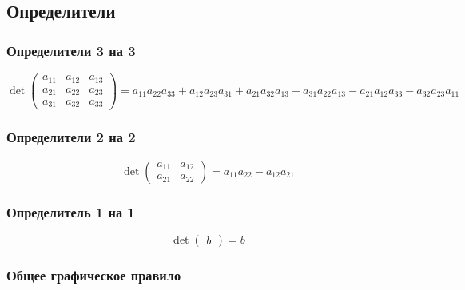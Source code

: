 \documentclass[class=article,a4paper,12pt,crop=false]{standalone}
\begin{document}
  \subsection{Определители}
  
  \subsubsection{Определители 3 на 3}

    \begin{equation}
      \det{
        \begin{pmatrix}
          a_{11} & a_{12} & a_{13} \\
          a_{21} & a_{22} & a_{23} \\
          a_{31} & a_{32} & a_{33}
        \end{pmatrix}
      }
      = a_{11}a_{22}a_{33}
      + a_{12}a_{23}a_{31}
      + a_{21}a_{32}a_{13}
      - a_{31}a_{22}a_{13}
      - a_{21}a_{12}a_{33}
      - a_{32}a_{23}a_{11}
    \end{equation}

  \subsubsection{Определители 2 на 2}

  \begin{equation}
    \det{
      \begin{pmatrix}
        a_{11} &a_{12} \\
        a_{21} & a_{22}
      \end{pmatrix}
    } = a_{11}a_{22} - a_{12}a_{21}
  \end{equation}

  \subsubsection{Определитель 1 на 1}

  \begin{equation}
    \det{
      \begin{pmatrix}
        b
      \end{pmatrix}
    } = b
  \end{equation}

  \subsubsection{Общее графическое правило}
\end{document}
